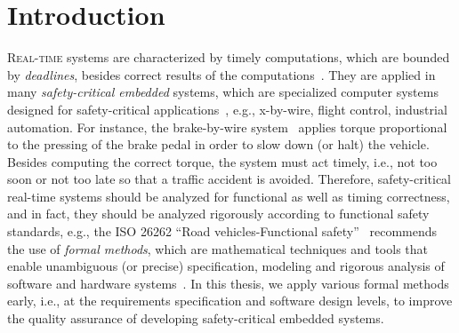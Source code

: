 \chapter{Introduction}\label{chapter_introduction}
\lettrine{R}{eal-time} systems are characterized by timely computations, which are bounded by \textit{deadlines}, besides correct results of the computations~\cite{Buttazzo2003}. They are applied in many \textit{safety-critical embedded} systems, which are specialized computer systems designed for safety-critical applications~\cite{WangJiacun2017RES}, e.g., x-by-wire, flight control, industrial automation. For instance, the brake-by-wire system~\cite{Navet2010DesignSystems} applies torque proportional to the pressing of the brake pedal in order to slow down (or halt) the vehicle. Besides computing the correct torque, the system must act timely, i.e., not too soon or not too late so that a traffic accident is avoided. Therefore, safety-critical real-time systems should be analyzed for functional as well as timing correctness, and in fact, they should be analyzed rigorously according to functional safety standards, e.g., the ISO 26262 ``Road vehicles-Functional safety''~\cite{iso201126262} recommends the use of \textit{formal methods}, which are mathematical techniques and tools that enable unambiguous (or precise) specification, modeling and rigorous analysis of software and hardware systems~\cite{o2017concise}. In this thesis, we apply various formal methods early, i.e., at the requirements specification and software design levels, to improve the quality assurance of developing safety-critical embedded systems.

